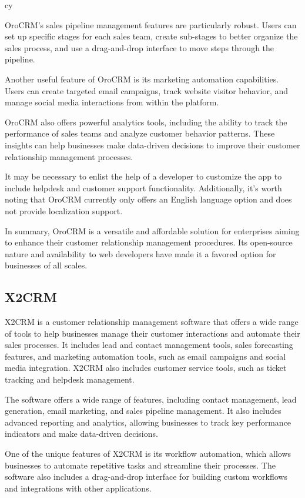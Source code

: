 cy\documentclass{article}
\begin{document}
OroCRM's sales pipeline management features are particularly robust. Users can set up specific stages for each sales team, create sub-stages to better organize the sales process, and use a drag-and-drop interface to move steps through the pipeline.

Another useful feature of OroCRM is its marketing automation capabilities. Users can create targeted email campaigns, track website visitor behavior, and manage social media interactions from within the platform.

OroCRM also offers powerful analytics tools, including the ability to track the performance of sales teams and analyze customer behavior patterns. These insights can help businesses make data-driven decisions to improve their customer relationship management processes.

It may be necessary to enlist the help of a developer to customize the app to include helpdesk and customer support functionality. Additionally, it's worth noting that OroCRM currently only offers an English language option and does not provide localization support.

In summary, OroCRM is a versatile and affordable solution for enterprises aiming to enhance their customer relationship management procedures. Its open-source nature and availability to web developers have made it a favored option for businesses of all scales.

\subsection{X2CRM}

X2CRM is a customer relationship management software that offers a wide range of tools to help businesses manage their customer interactions and automate their sales processes. It includes lead and contact management tools, sales forecasting features, and marketing automation tools, such as email campaigns and social media integration. X2CRM also includes customer service tools, such as ticket tracking and helpdesk management.

The software offers a wide range of features, including contact management, lead generation, email marketing, and sales pipeline management. It also includes advanced reporting and analytics, allowing businesses to track key performance indicators and make data-driven decisions.

One of the unique features of X2CRM is its workflow automation, which allows businesses to automate repetitive tasks and streamline their processes. The software also includes a drag-and-drop interface for building custom workflows and integrations with other applications.
\end{document}
